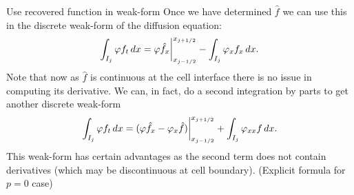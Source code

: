 \documentclass[aspectratio=169]{beamer}
\begin{document}
\begin{frame}{Use recovered function in weak-form}
  Once we have determined $\hat{f}$ we can use this in the discrete
  weak-form of the diffusion equation:
  \begin{align*}
    \int_{I_j} \varphi f_t \thinspace dx =   \varphi \hat{f}_x \bigg|^{x_{j+1/2}}_{x_{j-1/2}}
    -
    \int_{I_j} \varphi_{x} f_x \thinspace dx.
  \end{align*}
  Note that now as $\hat{f}$ is continuous at the cell interface there
  is no issue in computing its derivative. We can, in fact, do a
  second integration by parts to get another discrete weak-form
  \begin{align*}
    \int_{I_j} \varphi f_t \thinspace dx =   (\varphi \hat{f}_x - \varphi_x \hat{f})\bigg|^{x_{j+1/2}}_{x_{j-1/2}}
    +
    \int_{I_j} \varphi_{xx} f \thinspace dx.
  \end{align*}
  This weak-form has certain advantages as the second term does not
  contain derivatives (which may be discontinuous at cell
  boundary). (Explicit formula for $p=0$ case)
\end{frame}
\end{document}
